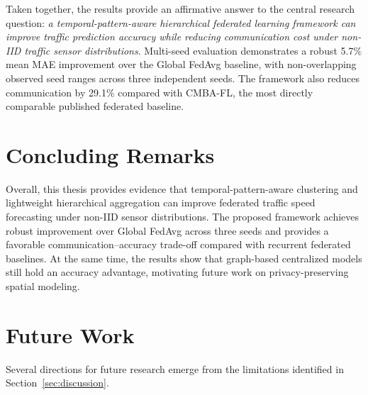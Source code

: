 Taken together, the results provide an affirmative answer to the central research question: \textit{a temporal-pattern-aware hierarchical federated learning framework can improve traffic prediction accuracy while reducing communication cost under non-IID traffic sensor distributions}. Multi-seed evaluation demonstrates a robust 5.7\% mean MAE improvement over the Global FedAvg baseline, with non-overlapping observed seed ranges across three independent seeds. The framework also reduces communication by 29.1\% compared with CMBA-FL, the most directly comparable published federated baseline.

\section{Concluding Remarks}

Overall, this thesis provides evidence that temporal-pattern-aware clustering and lightweight hierarchical aggregation can improve federated traffic speed forecasting under non-IID sensor distributions. The proposed framework achieves robust improvement over Global FedAvg across three seeds and provides a favorable communication--accuracy trade-off compared with recurrent federated baselines. At the same time, the results show that graph-based centralized models still hold an accuracy advantage, motivating future work on privacy-preserving spatial modeling.

\section{Future Work}

Several directions for future research emerge from the limitations identified in Section~\ref{sec:discussion}.

